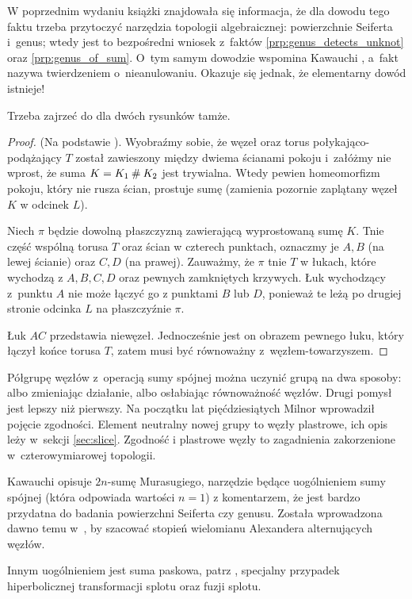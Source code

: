 W poprzednim wydaniu książki znajdowała się informacja, że dla dowodu tego faktu trzeba przytoczyć narzędzia topologii algebraicznej: powierzchnie Seiferta i~genus; wtedy jest to bezpośredni wniosek z~faktów \ref{prp:genus_detects_unknot} oraz \ref{prp:genus_of_sum}.
O~tym samym dowodzie wspomina Kawauchi \cite[s. 33]{kawauchi96}, a~fakt nazywa twierdzeniem o~nieanulowaniu.
Okazuje się jednak, że elementarny dowód istnieje!

Trzeba zajrzeć do \cite[s. 18-20]{kauffman95} dla dwóch rysunków tamże.

\begin{proof}
    (Na podstawie \cite[s. 18-20]{kauffman95}).
    Wyobraźmy sobie, że węzeł oraz torus połykająco-podążający $T$ został zawieszony między dwiema ścianami pokoju i~załóżmy nie wprost, że suma $K = K_1 \mathbin{\#} K_2$ jest trywialna.
    Wtedy pewien homeomorfizm pokoju, który nie rusza ścian, prostuje sumę (zamienia pozornie zaplątany węzeł $K$ w odcinek $L$). 

    Niech $\pi$ będzie dowolną płaszczyzną zawierającą wyprostowaną sumę $K$.
    Tnie część wspólną torusa $T$ oraz ścian w czterech punktach, oznaczmy je $A, B$ (na lewej ścianie) oraz $C, D$ (na prawej).
    Zauważmy, że $\pi$ tnie $T$ w łukach, które wychodzą z $A, B, C, D$ oraz pewnych zamkniętych krzywych.
    Łuk wychodzący z~punktu $A$ nie może łączyć go z punktami $B$ lub $D$, ponieważ te leżą po drugiej stronie odcinka $L$ na płaszczyźnie $\pi$.
    
    Łuk $AC$ przedstawia niewęzeł.
    Jednocześnie jest on obrazem pewnego łuku, który łączył końce torusa $T$, zatem musi być równoważny z~węzłem-towarzyszem.
\end{proof}

Półgrupę węzłów z~operacją sumy spójnej można uczynić grupą na dwa sposoby: albo zmieniając działanie, albo osłabiając równoważność węzłów.
Drugi pomysł jest lepszy niż pierwszy.
Na początku lat pięćdziesiątych Milnor wprowadził pojęcie zgodności.
%
%
Element neutralny nowej grupy to węzły plastrowe, ich opis leży w~sekcji \ref{sec:slice}.
Zgodność i plastrowe węzły to zagadnienia zakorzenione w~czterowymiarowej topologii.

Kawauchi \cite[s. 50-53]{kawauchi96} opisuje $2n$-sumę Murasugiego, narzędzie będące uogólnieniem sumy spójnej (która odpowiada wartości $n = 1$) z komentarzem, że jest bardzo przydatna do badania powierzchni Seiferta czy genusu.
%
Została wprowadzona dawno temu w~\cite{murasugi58}, by szacować stopień wielomianu Alexandera alternujących węzłów.

Innym uogólnieniem jest suma paskowa, patrz \cite[s. 31-32, 43]{kawauchi96}, specjalny przypadek hiperbolicznej transformacji splotu oraz fuzji splotu.



